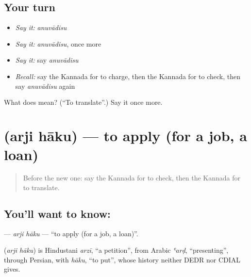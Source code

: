 \subsection*{Your turn}
\begin{itemize}
\raggedright
  \item \emph{Say it:} \emph{anuvādisu}
  \item \emph{Say it:} \emph{anuvādisu}, once more
  \item \emph{Say it:} say \emph{anuvādisu}
  \item \emph{Recall:} say the Kannada for to charge, then the Kannada for to check, then say \emph{anuvādisu} again
\end{itemize}

\begin{tcolorbox}[breakable,colback=teal!4,colframe=teal!35!black,title={Before you move on}]
What does  mean? (\textquotedblleft{}To translate\textquotedblright{}.) Say it once more.
\end{tcolorbox}
\section[\texorpdfstring{\kn{ಅರ್ಜಿ} \kn{ಹಾಕು} (arji hāku)}{ಅರ್ಜಿ ಹಾಕು (arji hāku)}]{  (arji hāku) — to apply (for a job, a loan)}

\label{lesson:KA-C275-arji-haku}



\begin{quote}
Before the new one: say the Kannada for to check, then the Kannada for to translate.
\end{quote}

\subsection*{You'll want to know:  }
\textbf{ } — \emph{arji hāku} — \textquotedblleft{}to apply (for a job, a loan)\textquotedblright{}.

\begin{cousinweb}
\textbf{ } (\emph{arji hāku}) is Hindustani \emph{arzī}, \textquotedblleft{}a petition\textquotedblright{}, from Arabic \emph{ʿarḍ}, \textquotedblleft{}presenting\textquotedblright{}, through Persian, with \emph{hāku}, \textquotedblleft{}to put\textquotedblright{}, whose history neither DEDR nor CDIAL gives.
\end{cousinweb}


